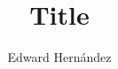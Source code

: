 \documentclass{beamer}
\title{Title}
\author{Edward Hern\'{a}ndez}
\institute{}
\begin{document}
\begin{frame} 
\titlepage
\end{frame}

\begin{frame}


\end{frame}
\end{document}
